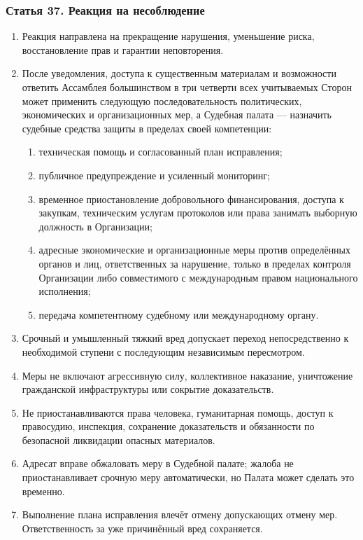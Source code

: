 \documentclass[
  russian,
  11pt,
  a4paper,
]{article}
\providecommand{\tightlist}{%
  \setlength{\itemsep}{0pt}\setlength{\parskip}{0pt}}
\begin{document}
\subsubsection{Статья 37. Реакция на
несоблюдение}\label{ux441ux442ux430ux442ux44cux44f-37-ux440ux435ux430ux43aux446ux438ux44f-ux43dux430-ux43dux435ux441ux43eux431ux43bux44eux434ux435ux43dux438ux435}

\begin{enumerate}
\def\labelenumi{\arabic{enumi}.}
\tightlist
\item
  Реакция направлена на прекращение нарушения, уменьшение риска,
  восстановление прав и гарантии неповторения.
\item
  После уведомления, доступа к существенным материалам и возможности
  ответить Ассамблея большинством в три четверти всех учитываемых Сторон
  может применить следующую последовательность политических,
  экономических и организационных мер, а Судебная палата --- назначить
  судебные средства защиты в пределах своей компетенции:

  \begin{enumerate}
  \def\labelenumii{\arabic{enumii}.}
  \tightlist
  \item
    техническая помощь и согласованный план исправления;
  \item
    публичное предупреждение и усиленный мониторинг;
  \item
    временное приостановление добровольного финансирования, доступа к
    закупкам, техническим услугам протоколов или права занимать выборную
    должность в Организации;
  \item
    адресные экономические и организационные меры против определённых
    органов и лиц, ответственных за нарушение, только в пределах
    контроля Организации либо совместимого с международным правом
    национального исполнения;
  \item
    передача компетентному судебному или международному органу.
  \end{enumerate}
\item
  Срочный и умышленный тяжкий вред допускает переход непосредственно к
  необходимой ступени с последующим независимым пересмотром.
\item
  Меры не включают агрессивную силу, коллективное наказание, уничтожение
  гражданской инфраструктуры или сокрытие доказательств.
\item
  Не приостанавливаются права человека, гуманитарная помощь, доступ к
  правосудию, инспекция, сохранение доказательств и обязанности по
  безопасной ликвидации опасных материалов.
\item
  Адресат вправе обжаловать меру в Судебной палате; жалоба не
  приостанавливает срочную меру автоматически, но Палата может сделать
  это временно.
\item
  Выполнение плана исправления влечёт отмену допускающих отмену мер.
  Ответственность за уже причинённый вред сохраняется.
\end{enumerate}
\end{document}
